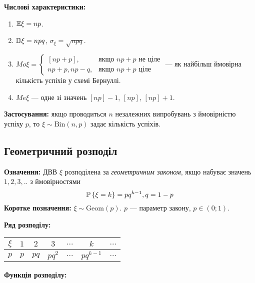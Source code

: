 \noindent\textbf{Числові характеристики:}
\begin{enumerate}
    \item $\E\xi = np$.
    \item $\D\xi = npq$, $\sigma_\xi = \sqrt{npq}$.
    \item ${Mo}\xi = \begin{cases}
        \left[np+p\right], & \text{якщо } np+p \text{ не ціле}\\
        np+p, np-q, & \text{якщо } np+p \text{ ціле}
    \end{cases}$ --- як найбільш ймовірна кількість успіхів у схемі Бернуллі.
    \item ${Me}\xi$ --- одне зі значень $\left[np\right] - 1$, $\left[np\right]$, $\left[np\right] + 1$.
\end{enumerate}

\noindent\textbf{Застосування:} якщо проводиться $n$ незалежних випробувань з ймовірністю успіху $p$, 
то $\xi \sim \mathrm{Bin}(n, p)$ задає кількість успіхів.

\subsection{Геометричний розподіл}
\noindent\textbf{Означення:}
    ДВВ $\xi$ розподілена за \emph{геометричним законом}, 
    якщо набуває значень $1,2,3,..$ з ймовірностями \begin{equation}
        \P\left\{\xi = k\right\} = pq^{k-1}, q = 1 - p
    \end{equation}
    \textbf{Коротке позначення:} $\xi \sim \mathrm{Geom}(p)$.
    $p$ --- параметр закону, $p\in (0;1)$.

\noindent\textbf{Ряд розподілу:}

\begin{tabular}{|c|c|c|c|c|c|c|}
    \hline
    $\xi$ & $1$ & $2$ & $3$ & $...$ & $k$ & $...$ \\
    \hline
    $p$ & $p$ & $pq$ & $pq^2$ & $...$ & $pq^{k-1}$ & $...$ \\
    \hline
\end{tabular}

\noindent\textbf{Функція розподілу:}

